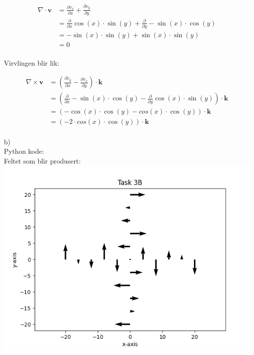 \documentclass[12pt, a4paper]{article}
\begin{document}
\begin{equation}
    \begin{split}
        \nabla \cdot \textbf{v} &= \frac{\partial v_x}{\partial x} + \frac{\partial v_y}{\partial y} \\
                                &= \frac{\partial}{\partial x} \cos(x) \cdot \sin(y) + \frac{\partial}{\partial y} -\sin(x) \cdot \cos(y) \\
                                &= -\sin(x) \cdot \sin(y) + \sin(x) \cdot \sin(y) \\
                                &= 0
    \end{split}
\end{equation}
\\
Virvlingen blir lik:

\begin{equation}
    \begin{split}
        \nabla \times \textbf{v} &= (\frac{\partial v_y}{\partial x} - \frac{\partial v_x}{\partial y}) \cdot \textbf{k} \\
                                 &= (\frac{\partial}{\partial x} -\sin(x) \cdot \cos(y) - \frac{\partial}{\partial y} \cos(x) \cdot \sin(y)) \cdot \textbf{k} \\
                                 &= (-\cos(x) \cdot \cos(y) - cos(x) \cdot \cos(y)) \cdot \textbf{k} \\
                                 &= (-2 \cdot cos(x) \cdot \cos(y)) \cdot \textbf{k}
    \end{split}
\end{equation}
\\
b) \\
Python kode: \\

Feltet som blir produsert: \\
\hspace*{-1.5cm}
\includegraphics[scale=0.8]{three_b}
\end{document}
